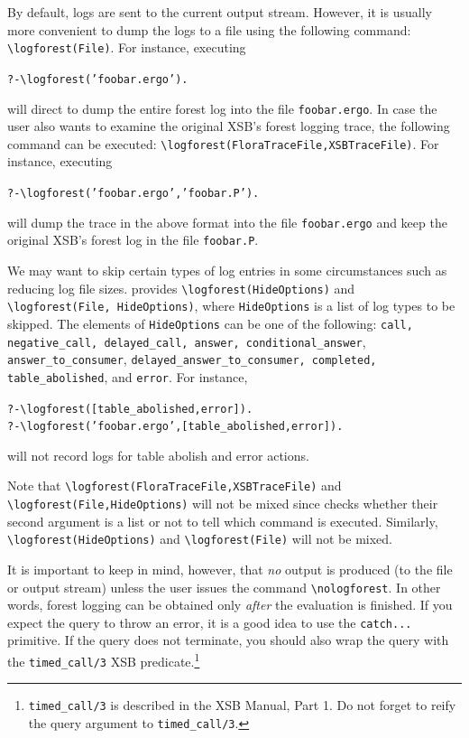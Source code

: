 \documentclass[11pt]{article}
\newcommand{\ERGO}{\mbox{\smaller{\ensuremath{\cal{E}}\smaller{{\sc{RGO}}}}}\xspace}
\newcommand{\FLSYSTEM}{\ERGO}
\newcommand{\ergoext}{ergo\xspace}
\newcommand{\bs}{\textbackslash}
\begin{document}
By default, logs are sent to the current output stream. However, it is
usually more convenient
to dump the logs to a file using the following command:
{\tt \bs{}logforest(File)}. For instance, executing
\begin{alltt}
   ?- \bs{}logforest('foobar.\ergoext').
\end{alltt}
will direct \FLSYSTEM to dump the entire forest log into the file {\tt foobar.\ergoext}.
In case the user also wants to examine the original XSB's forest
logging trace, the following command can be executed: 
{\tt \bs{}logforest(FloraTraceFile,XSBTraceFile)}. For instance, executing
\begin{alltt}
   ?- \bs{}logforest('foobar.\ergoext', 'foobar.P').
\end{alltt}
will dump the trace in the above \FLSYSTEM format into the file {\tt foobar.\ergoext}
and keep the original XSB's forest log in the file {\tt foobar.P}. 

We may want to skip certain types of log entries in some circumstances such
as reducing log file sizes. \FLSYSTEM provides {\tt \bs{}logforest(HideOptions)} and 
{\tt \bs{}logforest(File, HideOptions)}, where {\tt HideOptions} is a list of log
types to be skipped.
The elements of {\tt HideOptions} can be one of the following:
\texttt{call,
  negative\_call, delayed\_call,  answer, conditional\_answer},
  \texttt{answer\_to\_consumer}, \texttt{delayed\_answer\_to\_consumer, completed,
  table\_abolished}, and {\tt error}. For instance,  
\begin{alltt}
   ?- \bs{}logforest([table_abolished, error]).
   ?- \bs{}logforest('foobar.\ergoext', [table_abolished, error]).
\end{alltt}
will not record logs for table abolish and error actions. 

Note that {\tt \bs{}logforest(FloraTraceFile,XSBTraceFile)} and 
{\tt \bs{}logforest(File,HideOptions)} will not be mixed since \FLSYSTEM
checks whether their second argument is a list or not to tell
which command is executed. 
Similarly, {\tt \bs{}logforest(HideOptions)} and {\tt \bs{}logforest(File)}
will not be mixed.

It is important to keep in mind, however, that \emph{no} output
is produced (to the file or output stream) unless the user issues the command
{\tt \bs{}nologforest}. In other words, forest logging can be obtained only
\emph{after} the evaluation is finished. 
If you expect the query to throw an error, it is a good idea to use the
\FLSYSTEM \texttt{catch{...}} primitive. If the query does not terminate,
you should also wrap the query with the \texttt{timed\_call/3} XSB predicate.\footnote{
  \texttt{timed\_call/3} is described in the XSB Manual, Part 1. Do not
  forget to reify the query argument to  \texttt{timed\_call/3}.
  }
\end{document}
